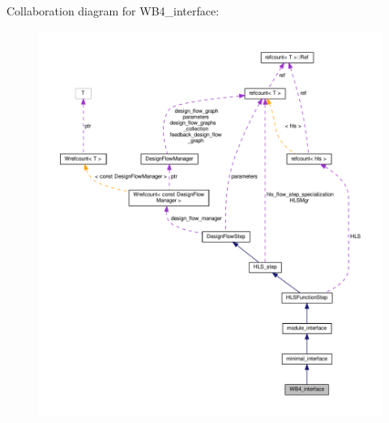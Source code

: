 Collaboration diagram for W\+B4\+\_\+interface\+:
\nopagebreak
\begin{figure}[H]
\begin{center}
\leavevmode
\includegraphics[width=350pt]{d7/d77/classWB4__interface__coll__graph}
\end{center}
\end{figure}
